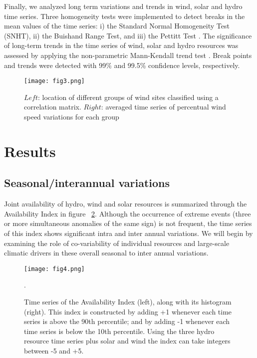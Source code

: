 \documentclass[AMA,Times1COL]{WileyNJDv5} %
\begin{document}
\begin{linenumbers}
Finally, we analyzed long term variations and trends in wind, solar and hydro time series. Three homogeneity tests were implemented to detect breaks in the mean values of the time series: i) the Standard Normal Homogeneity Test (SNHT), ii) the Buishand Range Test, and iii) the Pettitt Test \cite{ahmad2013homogeneity, bickici2019homogeneity}. The significance of long-term trends in the time series of wind, solar and hydro resources was assessed by applying the non-parametric Mann-Kendall trend test \cite{mcleod2005kendall}. Break points and trends were detected with 99\% and 99.5\% confidence levels, respectively.

\begin{figure}[hbpt]
	\centering
	\hspace*{0cm}   
	\texttt{[image: fig3.png]}
	\caption{\label{series} $Left$: location of different groups of wind sites classified using a correlation matrix. $Right$: averaged time series of percentual wind speed variations for each group}
\end{figure}

\section{Results}

\subsection{Seasonal/interannual variations}

Joint availability of hydro, wind and solar resources is summarized through the Availability Index in figure ~\ref{cases}. Although the occurrence of extreme events (three or more simultaneous anomalies of the same sign) is not frequent, the time series of this index shows significant intra and inter annual variations. We will begin by examining the role of co-variability of individual resources and large-scale climatic drivers in these overall seasonal to inter annual variations.

\begin{figure}[hbpt]
	\centering
	\hspace*{-1cm}   
	\texttt{[image: fig4.png]}
	\caption{\label{cases} Time series of the Availability Index (left), along with its histogram (right). This index is constructed by adding +1 whenever each time series is above the 90th percentile; and by adding -1 whenever each time series is below the 10th percentile. Using the three hydro resource time series plus solar and wind the index can take integers between -5 and +5.}. 
\end{figure}


\end{linenumbers}
\end{document}
